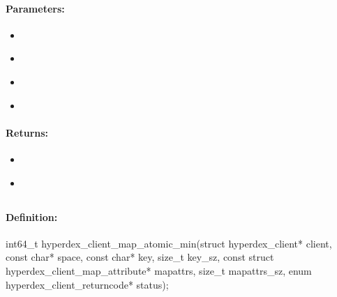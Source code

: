 \paragraph{Parameters:}
\begin{itemize}[noitemsep]
\item {}\\

\item {}\\

\item {}\\

\item {}\\

\end{itemize}

\paragraph{Returns:}
\begin{itemize}[noitemsep]
\item {}\\

\item {}\\

\end{itemize}

\pagebreak
\subsection{}
\label{api:c:map_atomic_min}


\paragraph{Definition:}
\begin{ccode}
int64_t hyperdex_client_map_atomic_min(struct hyperdex_client* client,
        const char* space,
        const char* key, size_t key_sz,
        const struct hyperdex_client_map_attribute* mapattrs, size_t mapattrs_sz,
        enum hyperdex_client_returncode* status);
\end{ccode}

